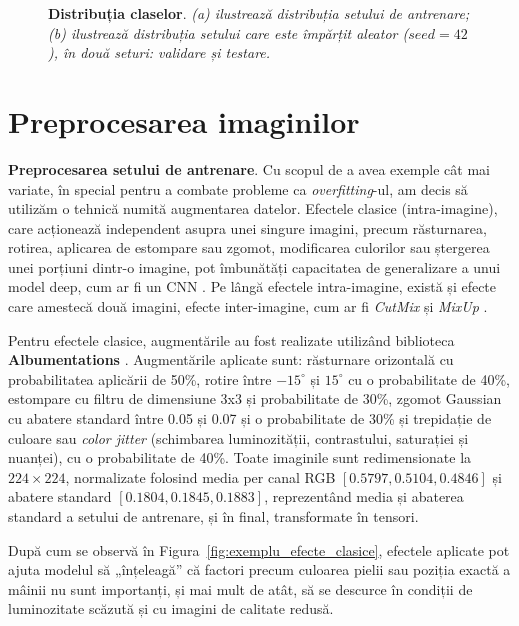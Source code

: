 \begin{figure}[H]
\begin{subfigure}{0.49\textwidth}
    \caption{}
  \end{subfigure}
  \caption[Distribuția claselor]{\textbf{Distribuția claselor}. \textit{(a) ilustrează distribuția setului de antrenare; (b) ilustrează distribuția setului care este împărțit aleator ($seed = 42$), în două seturi: validare și testare.}}
  \label{fig:class_distrib}
\end{figure}

\section{Preprocesarea imaginilor}

\textbf{Preprocesarea setului de antrenare}. Cu scopul de a avea exemple cât mai variate, în special pentru a combate probleme ca \textit{overfitting}-ul, am decis să utilizăm o tehnică numită augmentarea datelor. Efectele clasice (intra-imagine), care acționează independent asupra unei singure imagini, precum răsturnarea, rotirea, aplicarea de estompare sau zgomot, modificarea culorilor sau ștergerea unei porțiuni dintr-o imagine, pot îmbunătăți capacitatea de generalizare a unui model deep, cum ar fi un CNN \cite{data_augment1, data_augment2}. Pe lângă efectele intra-imagine, există și efecte care amestecă două imagini, efecte inter-imagine, cum ar fi \textit{CutMix} \cite{cutmix} și \textit{MixUp} \cite{mixup}.

Pentru efectele clasice, augmentările au fost realizate utilizând biblioteca \textbf{Albumentations} \cite{albumentations}. Augmentările aplicate sunt: răsturnare orizontală cu probabilitatea aplicării de 50\%, rotire între $-15^\circ$ și $15^\circ$ cu o probabilitate de 40\%, estompare cu filtru de dimensiune 3x3 și probabilitate de 30\%, zgomot Gaussian cu abatere standard între 0.05 și 0.07 și o probabilitate de 30\% și trepidație de culoare sau \textit{color jitter} (schimbarea luminozității, contrastului, saturației și nuanței), cu o probabilitate de 40\%. Toate imaginile sunt redimensionate la $224 \times 224$, normalizate folosind media per canal RGB $[0.5797, 0.5104, 0.4846]$ și abatere standard $[0.1804, 0.1845, 0.1883]$, reprezentând media și abaterea standard a setului de antrenare, și în final, transformate în tensori. 

După cum se observă în Figura~\ref{fig:exemplu_efecte_clasice}, efectele aplicate pot ajuta modelul să „înțeleagă” că factori precum culoarea pielii sau poziția exactă a mâinii nu sunt importanți, și mai mult de atât, să se descurce în condiții de luminozitate scăzută și cu imagini de calitate redusă.
 
